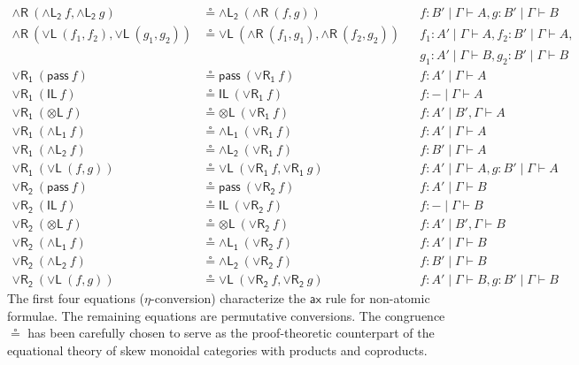 \documentclass[submission,copyright,creativecommons]{eptcs}
\theoremstyle{definition}
\newcommand{\tl}{\otimes \mathsf{L}}
\newcommand{\pass}{\mathsf{pass}}
\newcommand{\unitl}{\mathsf{IL}}
\newcommand{\andlone}{\land \mathsf{L_{1}}}
\newcommand{\andltwo}{\land \mathsf{L_{2}}}
\newcommand{\andr}{\land \mathsf{R}}
\newcommand{\orl}{\lor \mathsf{L}}
\newcommand{\orrone}{\lor \mathsf{R_{1}}}
\newcommand{\orrtwo}{\lor \mathsf{R_{2}}}
\newcommand{\ax}{\mathsf{ax}}
\newcommand{\ot}{\otimes}
\newcommand{\lolli}{\multimap}
\newcommand{\I}{\mathsf{I}}
\begin{document}
\begin{equation}
\begin{array}{rlll}
    \andr \ (\andltwo \ f , \andltwo \ g) &\circeq \andltwo \ (\andr \ (f , g)) &&f : B' \mid \Gamma \vdash A , g : B' \mid \Gamma \vdash B
    \\
    \andr \ (\orl \ (f_1 , f_2) , \orl \ (g_1 , g_2)) &\circeq \orl \ (\andr \ (f_1 , g_1) , \andr \ (f_2 , g_2)) &&f_1 : A' \mid \Gamma \vdash A , f_2 : B' \mid \Gamma \vdash A , 
    \\
    & &&g_1 : A' \mid \Gamma \vdash B , g_2 : B' \mid \Gamma \vdash B
    \\
    \orrone \ (\pass \ f) &\circeq \pass \ (\orrone \ f) &&f : A' \mid \Gamma \vdash A
    \\
    \orrone \ (\unitl \ f) &\circeq \unitl \ (\orrone \ f) &&f : - \mid \Gamma \vdash A
    \\
    \orrone \ (\tl \ f) &\circeq \tl \ (\orrone \ f) &&f : A' \mid B' , \Gamma \vdash A
    \\
    \orrone \ (\andlone \ f) &\circeq \andlone \ (\orrone \ f) &&f : A' \mid \Gamma \vdash A
    \\
    \orrone \ (\andltwo \ f) &\circeq \andltwo \ (\orrone \ f) &&f : B' \mid \Gamma \vdash A
    \\
    \orrone \ (\orl \ (f , g)) &\circeq \orl \ (\orrone \ f , \orrone \ g) &&f : A' \mid \Gamma \vdash A , g : B' \mid \Gamma \vdash A
    \\
    \orrtwo \ (\pass \ f) &\circeq \pass \ (\orrtwo \ f) &&f : A' \mid \Gamma \vdash B
    \\
    \orrtwo \ (\unitl \ f) &\circeq \unitl \ (\orrtwo \ f) &&f : - \mid \Gamma \vdash B
    \\
    \orrtwo \ (\tl \ f) &\circeq \tl \ (\orrtwo \ f) &&f : A' \mid B' , \Gamma \vdash B
    \\
    \orrtwo \ (\andlone \ f) &\circeq \andlone \ (\orrtwo \ f) &&f : A' \mid \Gamma \vdash B
    \\
    \orrtwo \ (\andltwo \ f) &\circeq \andltwo \ (\orrtwo \ f) &&f : B' \mid \Gamma \vdash B
    \\
    \orrtwo \ (\orl \ (f , g)) &\circeq \orl \ (\orrtwo \ f , \orrtwo \ g) &&f : A' \mid \Gamma \vdash B , g : B' \mid \Gamma \vdash B
  \end{array}
  \end{equation}
  The first four equations ($\eta$-conversion) characterize the $\ax$ rule for non-atomic formulae.
  The remaining equations are permutative conversions. The congruence $\circeq$ has been carefully chosen to serve as the proof-theoretic counterpart of the equational theory of skew monoidal categories with products and coproducts.
\end{document}
